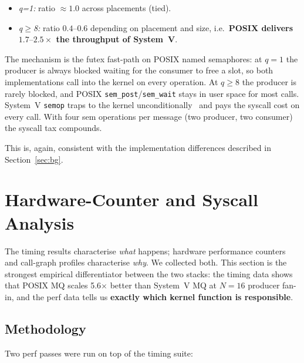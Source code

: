 \documentclass[a4paper,11pt]{article}
\begin{document}
\begin{itemize}[leftmargin=*]
\item \emph{q=1:} ratio $\approx 1.0$ across placements (tied).
\item \emph{q$\geq$8:} ratio $0.4$--$0.6$ depending on placement and
size, i.e.\ \textbf{POSIX delivers $\boldsymbol{1.7\text{--}2.5\times}$
the throughput of System~V}.
\end{itemize}

The mechanism is the futex fast-path on POSIX named semaphores: at
$q=1$ the producer is always blocked waiting for the consumer to free a
slot, so both implementations call into the kernel on every operation.
At $q\geq 8$ the producer is rarely blocked, and POSIX
\texttt{sem\_post}/\texttt{sem\_wait} stays in user space for most
calls. System~V \texttt{semop} traps to the kernel
unconditionally~\cite{linux_sysvipc, drepper2011futexes} and pays the
syscall cost on every call. With four sem operations per message (two
producer, two consumer) the syscall tax compounds.

This is, again, consistent with the implementation differences
described in Section~\ref{sec:bg}.

\section{Hardware-Counter and Syscall Analysis}
\label{sec:perf}

The timing results characterise \emph{what} happens; hardware
performance counters and call-graph profiles characterise \emph{why}.
We collected both. This section is the strongest empirical
differentiator between the two stacks: the timing data shows that
POSIX MQ scales 5.6$\times$ better than System~V MQ at $N=16$ producer
fan-in, and the perf data tells us \textbf{exactly which kernel
function is responsible}.

\subsection{Methodology}
\label{sec:perf:method}

Two perf passes were run on top of the timing suite:
\end{document}
